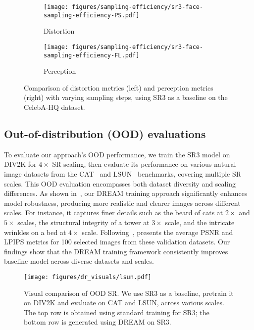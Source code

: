 \begin{figure}[t]
     \centering
     \begin{subfigure}[b]{0.23\textwidth}
         \centering
         \texttt{[image: figures/sampling-efficiency/sr3-face-sampling-efficiency-PS.pdf]}
         \caption{Distortion}
         \label{fig:sampling-ps}
     \end{subfigure}
     \begin{subfigure}[b]{0.242\textwidth}
         \centering
         \texttt{[image: figures/sampling-efficiency/sr3-face-sampling-efficiency-FL.pdf]}
         \caption{Perception}
         \label{fig:sampling-fl}
     \end{subfigure}
     \vspace{-.28in}
         \caption{Comparison of distortion metrics (left) and perception metrics (right) with varying sampling steps, using  SR3 as a baseline on the CelebA-HQ dataset.}
        \label{fig:sampling}
        \vspace{-.1in}
\end{figure}




\subsection{Out-of-distribution (OOD) evaluations}


To evaluate our approach's OOD performance, we train the SR3 model on DIV2K for $4\times$ SR scaling, then evaluate its performance on various natural image datasets from the CAT~\cite{zhang2008cat} and LSUN~\cite{yu2015lsun} benchmarks, covering multiple SR scales. This OOD evaluation encompasses both dataset diversity and scaling differences. As shown in~, our DREAM training approach significantly enhances model robustness, producing more realistic and clearer images across different scales. For instance, it captures finer details such as the beard of cats at $2\times$ and $5\times$ scales, the structural integrity of a tower at $3\times$ scale, and the intricate wrinkles on a bed at $4\times$ scale.  Following~\cite{gao2023implicit},  presents the average PSNR and LPIPS metrics for 100 selected images from these validation datasets. Our findings show that the DREAM training framework consistently improves baseline model across diverse datasets and scales. 


\begin{figure}[t]
\centering
\texttt{[image: figures/dr\_visuals/lsun.pdf]} %
\vspace{-.1in}
\caption{Visual comparison of OOD SR. We use SR3 as a baseline, pretrain it on DIV2K and evaluate on CAT and LSUN, across various scales. The top row is obtained using standard training for SR3; the bottom row is generated using DREAM on SR3. }
\label{fig:lsun}
\end{figure}

